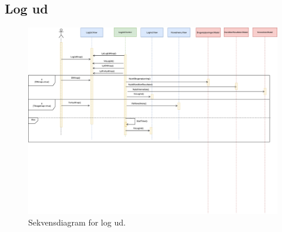 \subsection*{Log ud}

\begin{figure} [H]
\centering
\includegraphics[width=1\textwidth]{figures/Sek/SEKLogUd}
\caption{Sekvensdiagram for log ud.}
\label{fig:SEKLogUd}
\end{figure}